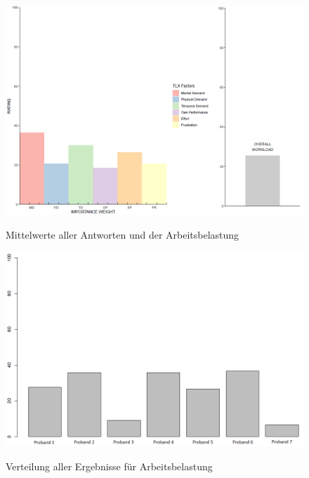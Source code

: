 \begin{figure}[h]
	\begin{center}
		\includegraphics[scale=0.5]{Resources/Evaluation/nasa_all.png}
		\label{nasa_all}
		\caption{Mittelwerte aller Antworten und der Arbeitsbelastung}	
	\end{center}
\end{figure}

\begin{figure}[h]
	\begin{center}
		\includegraphics[scale=0.5]{Resources/Evaluation/nasa_allWorkloads.png}
		\label{nasa_allWorkloads}
		\caption{Verteilung aller Ergebnisse für Arbeitsbelastung}	
	\end{center}
\end{figure}

